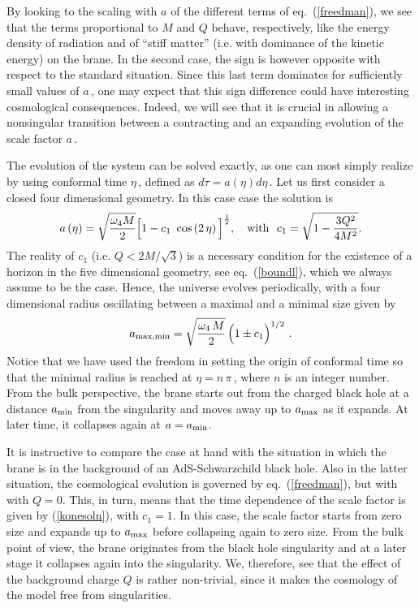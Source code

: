\documentclass[a4paper,11pt]{article}
\begin{document}
By looking to the scaling with $a$ of the different terms  of
eq.~(\ref{freedman}), we see that the terms proportional  to $M$ and $Q$
behave, respectively, like the energy density of  radiation and of ``stiff
matter'' (i.e. with dominance  of the kinetic energy) on the brane.  In
the second case, the sign is  however opposite with respect to the
standard situation. Since this last  term dominates for sufficiently small
values of $a\,$, one may expect  that this sign difference could have
interesting cosmological  consequences. Indeed, we will see that it is
crucial in allowing  a nonsingular transition between a contracting and
an  expanding evolution of the scale factor $a\,$. 

The evolution of the system can be solved exactly, as one can most simply
realize by using conformal time  $\eta\,$, defined as $d\tau = a(\eta)
d\eta\,$. Let us first consider a closed four dimensional  geometry. In
this case case the solution is
%
\begin{equation}
a \left( \eta \right) = \sqrt{\omega_4 M\over 2} \Big[ 1 - c_1 ~\cos \left( 2 \, \eta \right) \Big]^{1\over 2},
~~~{\rm with}~~ c_1 = \sqrt{1 - {3 Q^2\over{4 M^2}}}.
\label{konesoln}
\end{equation}
%
The reality of $c_1$ (i.e. $Q < 2 M/{\sqrt 3}$) is a necessary condition
for the existence of a horizon in the five dimensional geometry, see
eq.~(\ref{boundl}), which we always assume to be the case. Hence, the
universe evolves periodically, with a four dimensional radius oscillating
between a maximal and a minimal size given by
%
\begin{equation}
a_{\rm max,min} = 
\sqrt{\frac{\omega_4 \, M}{2}} \, \Big( 1 \pm c_1 \Big)^{1/2} \,\,.
\label{minmax}
\end{equation}
%
Notice that we have used the freedom in setting the origin of conformal
time so that the minimal radius is reached at $\eta = n \, \pi\,$, where
$n$ is an integer number. From the bulk perspective, the brane  starts out
from the charged black hole at a distance $a_{\rm min}$ from the 
singularity  and moves away up to $a_{\rm max}$ as it  expands. At later
time, it collapses again at $a = a_{\rm min}$.

It is instructive to compare the case at hand with the situation in which
the brane is in the background of an AdS-Schwarzchild black hole. Also in
the latter situation, the cosmological evolution is governed by
eq.~(\ref{freedman}), but with with $Q=0$. This, in turn, means that the
time dependence of the scale factor is given by (\ref{konesoln}), with 
$c_1 = 1$. In this case, the scale factor starts from zero size 
and expands up to $a_{\rm max}$ before collapsing again to zero
size. From the bulk point of view, the brane originates from
the black hole singularity and at a later stage it collapses again into the
singularity. We, therefore, see that the effect of the background charge
$Q$ is rather non-trivial, since it makes the cosmology of the model free
from singularities.
\end{document}
